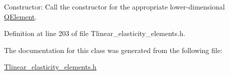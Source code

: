 Constructor\+: Call the constructor for the appropriate lower-\/dimensional \hyperlink{classoomph_1_1QElement}{Q\+Element}. 



Definition at line 203 of file Tlinear\+\_\+elasticity\+\_\+elements.\+h.



The documentation for this class was generated from the following file\+:\begin{DoxyCompactItemize}
\item 
\hyperlink{Tlinear__elasticity__elements_8h}{Tlinear\+\_\+elasticity\+\_\+elements.\+h}\end{DoxyCompactItemize}
